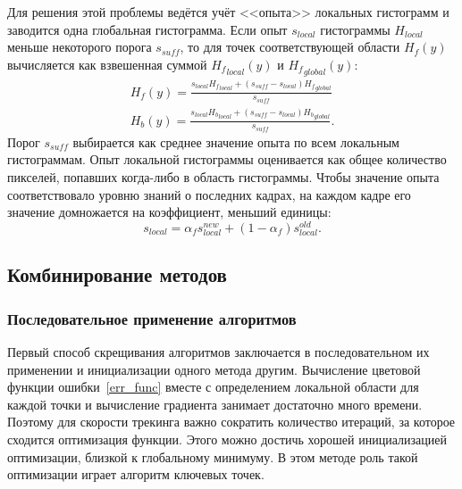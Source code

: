 Для решения этой проблемы ведётся учёт <<опыта>> локальных гистограмм и
заводится одна глобальная гистограмма.
Если опыт $s_{local}$ гистограммы $H_{local}$ меньше некоторого порога
$s_{suff}$, то для точек соответствующей области $H_f(y)$ вычисляется как
взвешенная суммой ${H_f}_{local}(y)$ и ${H_f}_{global}(y)$:
\begin{equation} \label{eqn:histo_skill} \begin{array}{c} H_f(y) =
\frac{s_{local} {H_f}_{local} + (s_{suff} - s_{local})
{H_f}_{global}}{s_{suff}} \\ H_b(y) = \frac{s_{local} {H_b}_{local} + (s_{suff}
- s_{local}) {H_b}_{global}}{s_{suff}} \text{.} \end{array} \end{equation}
Порог $s_{suff}$ выбирается как среднее значение опыта по всем локальным
гистограммам. Опыт локальной гистограммы оценивается как общее количество
пикселей, попавших когда-либо в область гистограммы. Чтобы значение опыта
соответствовало уровню знаний о последних кадрах, на каждом кадре его значение
домножается на коэффициент, меньший единицы:
\begin{equation} s_{local} = \alpha_f s_{local}^{new} + (1 - \alpha_f)
s_{local}^{old} \text{.} \end{equation}

\subsection{Комбинирование методов}

\subsubsection{Последовательное применение алгоритмов}
Первый способ скрещивания алгоритмов заключается в последовательном их
применении и инициализации одного метода другим. Вычисление цветовой функции
ошибки~\ref{err_func} вместе с определением локальной области для каждой точки
и вычисление градиента занимает достаточно много времени. Поэтому для скорости
трекинга важно сократить количество итераций, за которое сходится оптимизация
функции. Этого можно достичь хорошей инициализацией оптимизации, близкой к
глобальному минимуму. В этом методе роль такой оптимизации играет алгоритм
ключевых точек.


